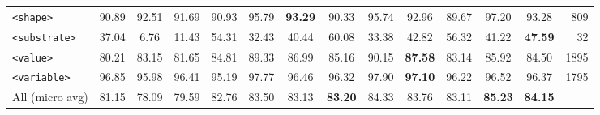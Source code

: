 \documentclass[]{interact}
\theoremstyle{plain}%
\theoremstyle{definition}
\theoremstyle{remark}
\begin{document}
\begin{table}[ht]
{{\begin{tabular}{l ccc ccc ccc ccc r}
            \texttt{<shape>}       & 90.89                            & 92.51                                     & 91.69                                              & 90.93      & 95.79      & \textbf{93.29} & 90.33          & 95.74      & 92.96          & 89.67      & 97.20          & 93.28          & 809  \\
            \texttt{<substrate>}   & 37.04                            & 6.76                                      & 11.43                                              & 54.31      & 32.43      & 40.44          & 60.08          & 33.38      & 42.82          & 56.32      & 41.22          & \textbf{47.59} & 32   \\
            \texttt{<value>}       & 80.21                            & 83.15                                     & 81.65                                              & 84.81      & 89.33      & 86.99          & 85.16          & 90.15      & \textbf{87.58} & 83.14      & 85.92          & 84.50          & 1895 \\
            \texttt{<variable>}    & 96.85                            & 95.98                                     & 96.41                                              & 95.19      & 97.77      & 96.46          & 96.32          & 97.90      & \textbf{97.10} & 96.22      & 96.52          & 96.37          & 1795 \\
            \midrule
            All (micro avg)        & 81.15                            & 78.09                                     & 79.59                                              & 82.76      & 83.50      & 83.13          & \textbf{83.20} & 84.33      & 83.76          & 83.11      & \textbf{85.23} & \textbf{84.15} &      \\
            \bottomrule
        \end{tabular}
    }
    }
    \label{tab:evaluation-10fold-material-parser}
\end{table}
\end{document}
